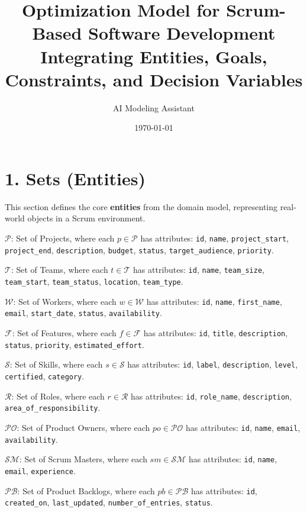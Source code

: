 \documentclass[12pt]{article}
\title{\Huge Optimization Model for Scrum-Based Software Development \\ \Large Integrating Entities, Goals, Constraints, and Decision Variables}
\author{\Large AI Modeling Assistant}
\date{\today}
\begin{document}
\maketitle
\tableofcontents
\newpage

\section{1. Sets (Entities)}

This section defines the core \textbf{entities} from the domain model, representing real-world objects in a Scrum environment.

\item $\mathcal{P}$: Set of Projects, where each $p \in \mathcal{P}$ has attributes: \texttt{id}, \texttt{name}, \texttt{project\_start}, \texttt{project\_end}, \texttt{description}, \texttt{budget}, \texttt{status}, \texttt{target\_audience}, \texttt{priority}.
    \item $\mathcal{T}$: Set of Teams, where each $t \in \mathcal{T}$ has attributes: \texttt{id}, \texttt{name}, \texttt{team\_size}, \texttt{team\_start}, \texttt{team\_status}, \texttt{location}, \texttt{team\_type}.
    \item $\mathcal{W}$: Set of Workers, where each $w \in \mathcal{W}$ has attributes: \texttt{id}, \texttt{name}, \texttt{first\_name}, \texttt{email}, \texttt{start\_date}, \texttt{status}, \texttt{availability}.
    \item $\mathcal{F}$: Set of Features, where each $f \in \mathcal{F}$ has attributes: \texttt{id}, \texttt{title}, \texttt{description}, \texttt{status}, \texttt{priority}, \texttt{estimated\_effort}.
    \item $\mathcal{S}$: Set of Skills, where each $s \in \mathcal{S}$ has attributes: \texttt{id}, \texttt{label}, \texttt{description}, \texttt{level}, \texttt{certified}, \texttt{category}.
    \item $\mathcal{R}$: Set of Roles, where each $r \in \mathcal{R}$ has attributes: \texttt{id}, \texttt{role\_name}, \texttt{description}, \texttt{area\_of\_responsibility}.
    \item $\mathcal{PO}$: Set of Product Owners, where each $po \in \mathcal{PO}$ has attributes: \texttt{id}, \texttt{name}, \texttt{email}, \texttt{availability}.
    \item $\mathcal{SM}$: Set of Scrum Masters, where each $sm \in \mathcal{SM}$ has attributes: \texttt{id}, \texttt{name}, \texttt{email}, \texttt{experience}.
    \item $\mathcal{PB}$: Set of Product Backlogs, where each $pb \in \mathcal{PB}$ has attributes: \texttt{id}, \texttt{created\_on}, \texttt{last\_updated}, \texttt{number\_of\_entries}, \texttt{status}.
\end{document}
